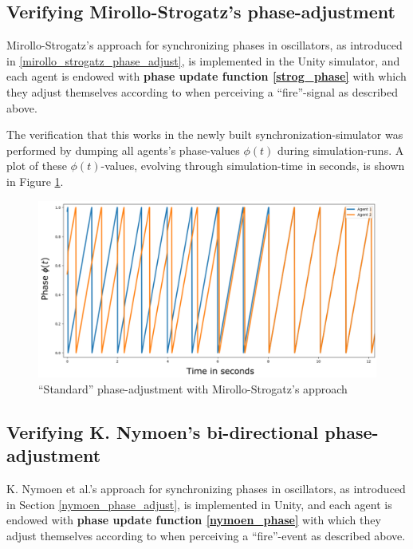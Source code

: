 	
	
	\subsection{Verifying Mirollo-Strogatz's phase-adjustment} %
	
	Mirollo-Strogatz's approach for synchronizing phases in oscillators, as introduced in \ref{mirollo_strogatz_phase_adjust}, is implemented in the Unity simulator, and each agent is endowed with \textbf{phase update function \eqref{strog_phase}} with which they adjust themselves according to when perceiving a ``fire''-signal as described above.
	
	The verification that this works in the newly built synchronization-simulator was performed by dumping all agents's phase-values $\phi(t)$ during simulation-runs. A plot of these $\phi(t)$-values, evolving through simulation-time in seconds, is shown in Figure \ref{fig:strog_phase}.
	
	\begin{figure}[h]
		\centering
		\includegraphics[width=0.9\linewidth]{Assets/Figures/MirolloStrogatzPhaseAdjustmentSecondTry.pdf}
		\caption[Illustration of Mirollo-Strogatz's ``standard'' phase-adjustment]{``Standard'' phase-adjustment with Mirollo-Strogatz's approach}
		\label{fig:strog_phase}
	\end{figure}
	
	
	
	
	\subsection{Verifying K. Nymoen's bi-directional phase-adjustment} %
	
	K. Nymoen et al.'s approach for synchronizing phases in oscillators, as introduced in Section \ref{nymoen_phase_adjust}, is implemented in Unity, and each agent is endowed with \textbf{phase update function \eqref{nymoen_phase}} with which they adjust themselves according to when perceiving a ``fire''-event as described above.
	

